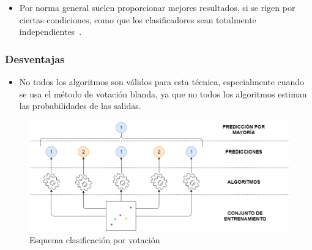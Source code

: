 \begin{itemize}
    \item Por norma general suelen proporcionar mejores resultados, si se rigen por ciertas condiciones, como que los clasificadores sean totalmente independientes~\cite{RUTA200563}.
\end{itemize}

\subsubsection{Desventajas}

\begin{itemize}
    \item No todos los algoritmos son válidos para esta técnica, especialmente cuando se usa el método de votación blanda, ya que no todos los algoritmos estiman las probabilidades de las salidas.
\end{itemize}


\begin{figure}[h]
    \centering
    \includegraphics[width=1\textwidth, keepaspectratio]{imaxes/schema_voting.png}
    \caption{Esquema clasificación por votación}
    \label{fig:schematic_Voting}
\end{figure}
